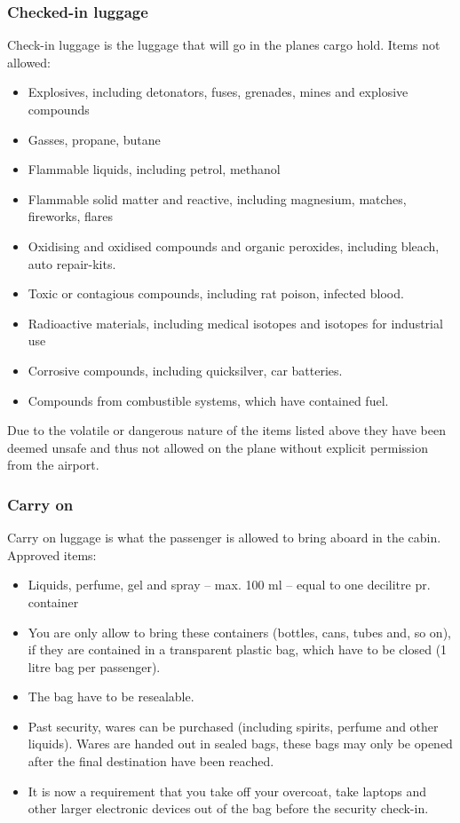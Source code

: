\subsubsection{Checked-in luggage}
Check-in luggage is the luggage that will go in the planes cargo hold.
\newline 
Items not allowed:
\begin{itemize}
\item Explosives, including detonators, fuses, grenades, mines and explosive compounds
\item Gasses, propane, butane
\item Flammable liquids, including petrol, methanol
\item Flammable solid matter and reactive, including magnesium, matches, fireworks, flares
\item Oxidising and oxidised compounds and organic peroxides, including bleach, auto repair-kits.
\item Toxic or contagious compounds, including rat poison, infected blood.
\item Radioactive materials, including medical isotopes and isotopes for industrial use
\item Corrosive compounds, including quicksilver, car batteries.
\item Compounds from combustible systems, which have contained fuel.
\end{itemize}
Due to the volatile or dangerous nature of the items listed above they have been deemed unsafe and thus not allowed on the plane without explicit permission from the airport.

\subsubsection{Carry on}
Carry on luggage is what the passenger is allowed to bring aboard in the cabin.
\newline
Approved items:
\begin{itemize}
\item Liquids, perfume, gel and spray – max. 100 ml – equal to one decilitre pr. container
\item You are only allow to bring these containers (bottles, cans, tubes and, so on), if they are contained in a transparent plastic bag, which have to be closed (1 litre bag per passenger).
\item The bag have to be resealable.
\item Past security, wares can be purchased (including spirits, perfume and other liquids). Wares are handed out in sealed bags, these bags may only be opened after the final destination have been reached.
\item It is now a requirement that you take off your overcoat, take laptops and other larger electronic devices out of the bag before the security check-in.\\
\citep{Prohibited_luggage}
\end{itemize}

